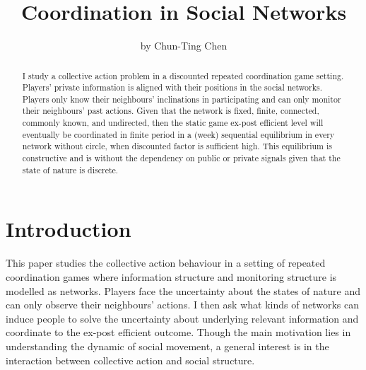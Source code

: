\documentclass[12pt,letter]{article}
\theoremstyle{definition}
\theoremstyle{remark}
\theoremstyle{claim}
\begin{document}

\title {Coordination in Social Networks}
\author {by Chun-Ting Chen}

\maketitle

\begin{abstract}

I study a collective action problem in a discounted repeated coordination game setting. Players' private information is aligned with their positions in the social networks. Players only know their neighbours' inclinations in participating and can only monitor their neighbours' past actions. Given that the network is fixed, finite, connected, commonly known, and undirected, then the static game ex-post efficient level will eventually be coordinated in finite period in a (week) sequential equilibrium in every network without circle, when discounted factor is sufficient high. This equilibrium is constructive and is without the dependency on public or private signals given that the state of nature is discrete.



\end{abstract}


\section{Introduction} 

This paper studies the collective action behaviour in a setting of repeated coordination games where information structure and monitoring structure is modelled as networks. Players face the uncertainty about the states of nature and can only observe their neighbours' actions. I then ask what kinds of networks can induce people to solve the uncertainty about underlying relevant information and coordinate to the ex-post efficient outcome. Though the main motivation lies in understanding the dynamic of social movement, a general interest is in the interaction between collective action and social structure.
\end{document}
